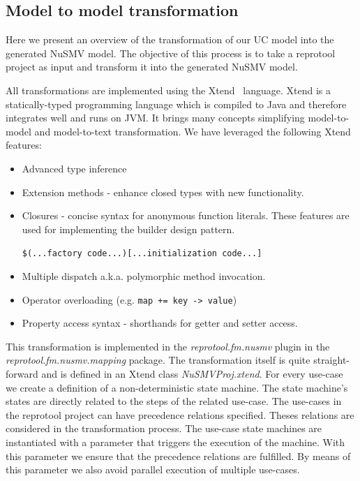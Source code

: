 \subsection{Model to model transformation}

Here we present an overview of the transformation of our UC model into the generated NuSMV model. The objective of this process is to take a reprotool project as input and transform it into the generated NuSMV model.

All transformations are implemented using the Xtend~\cite{Xtend-website} language.
Xtend is a statically-typed programming language which is compiled to Java and therefore integrates well and runs on JVM. It brings many concepts simplifying model-to-model and model-to-text transformation. We have leveraged the following Xtend features: 
\begin{itemize}
	\item Advanced type inference
	\item Extension methods - enhance closed types with new functionality.
	\item Closures - concise syntax for anonymous function literals.
		These features are used for implementing the builder design pattern.
	
		\verb|$(...factory code...)[...initialization code...]|
	
	\item Multiple dispatch a.k.a. polymorphic method invocation.
	\item Operator overloading (e.g. \verb|map += key -> value|)
	\item Property access syntax - shorthands for getter and setter access.
\end{itemize}

This transformation is implemented in the \emph{reprotool.fm.nusmv} plugin in the \emph{reprotool.fm.nusmv.mapping} package.
The transformation itself is quite straight-forward and is defined in an Xtend class \emph{NuSMVProj.xtend}.
For every use-case we create a definition of a non-deterministic state machine.
The state machine's states are directly related to the steps of the related use-case.
The use-cases in the reprotool project can have precedence relations specified. Theses relations are considered in the
transformation process. The use-case state machines are instantiated with a parameter that triggers the execution of the machine.
With this parameter we ensure that the precedence relations are fulfilled. By means of this parameter we also avoid parallel execution
of multiple use-cases.

